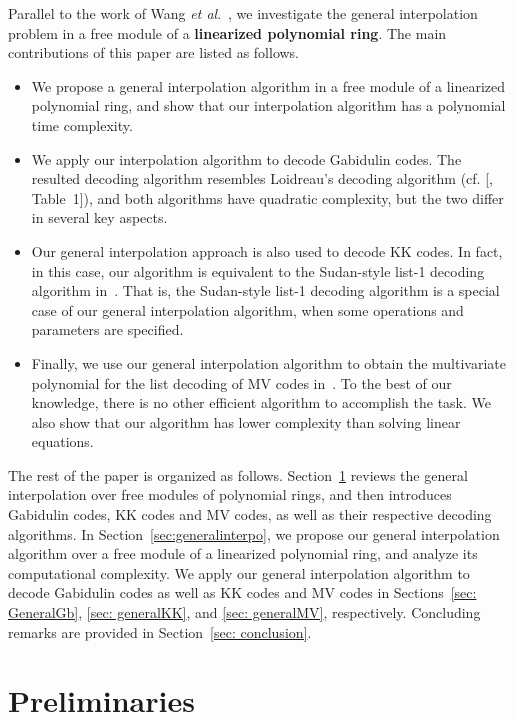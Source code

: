 \documentclass[11pt,onecolumn,draftcls]{IEEEtran}
\begin{document}
Parallel to the work of Wang \emph{et al}.~\cite{WangMcEliece05}, we investigate the general interpolation problem in a free module of a \textbf{linearized polynomial ring}. The main contributions of this paper are listed as follows.
\begin{itemize}
\item We propose a general interpolation algorithm in a free module of a linearized polynomial ring, and show that our interpolation algorithm has a polynomial time complexity.
\item We apply our interpolation algorithm to decode Gabidulin codes. The resulted decoding algorithm resembles Loidreau's decoding algorithm \makeatletter
    \renewcommand\@cite [1]{#1}
    \makeatother (cf. [\cite{loidreau_wcc05}, Table~1]), \makeatletter
    \renewcommand\@cite [1] {[#1]}
    \makeatother and both algorithms have quadratic complexity, but the two differ in several key aspects.
\item Our general interpolation approach is also used to decode KK codes. In fact, in this case, our algorithm is equivalent to the Sudan-style list-1 decoding algorithm in~\cite{kotter_it08}. That is, the Sudan-style list-1 decoding algorithm is a special case of our general interpolation algorithm, when some operations and parameters are specified.
\item Finally, we use our general interpolation algorithm to obtain the multivariate polynomial for the list decoding of MV codes in~\cite{mahdavifar_isit10}. To the best of our knowledge, there is no other efficient algorithm to accomplish the task. We also show that our algorithm has lower complexity than solving linear equations.
\end{itemize}

The rest of the paper is organized as follows. Section~\ref{sec:preliminaries} reviews the general interpolation over free modules of polynomial rings, and then introduces Gabidulin codes, KK codes and MV codes, as well as their respective decoding algorithms. In Section~\ref{sec:generalinterpo}, we propose our general interpolation algorithm over a free module of a linearized polynomial ring, and analyze its computational complexity. We apply our general interpolation algorithm to decode Gabidulin codes as well as KK codes and MV codes in Sections~\ref{sec: GeneralGb}, \ref{sec: generalKK}, and \ref{sec: generalMV}, respectively. Concluding remarks are provided in Section~\ref{sec: conclusion}.

\section{Preliminaries} \label{sec:preliminaries}
\end{document}
